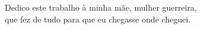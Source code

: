 \begin{dedicatoria}
   \vspace*{\fill}
   	\begin{flushright}
   \noindent
    Dedico este trabalho à minha mãe, mulher guerreira, \\que fez de tudo para que eu chegasse onde cheguei.
   	\end{flushright}
\end{dedicatoria}
